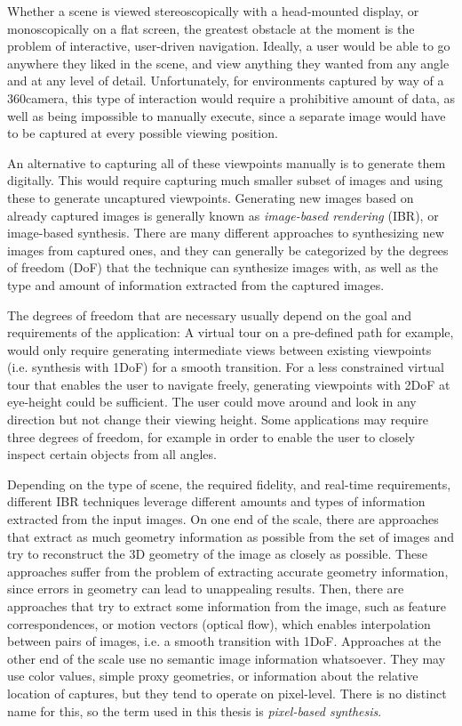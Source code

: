 Whether a scene is viewed stereoscopically with a head-mounted display, or monoscopically on a flat screen, the greatest obstacle at the moment is the problem of interactive, user-driven navigation. Ideally, a user would be able to go anywhere they liked in the scene, and view anything they wanted from any angle and at any level of detail. Unfortunately, for environments captured by way of a 360\degree camera, this type of interaction would require a prohibitive amount of data, as well as being impossible to manually execute, since a separate image would have to be captured at every possible viewing position.

An alternative to capturing all of these viewpoints manually is to generate them digitally. This would require capturing much smaller subset of images and using these to generate uncaptured viewpoints. Generating new images based on already captured images is generally known as \emph{image-based rendering} (IBR), or image-based synthesis. There are many different approaches to synthesizing new images from captured ones, and they can generally be categorized by the degrees of freedom (DoF) that the technique can synthesize images with, as well as the type and amount of information extracted from the captured images.

The degrees of freedom that are necessary usually depend on the goal and requirements of the application: A virtual tour on a pre-defined path for example, would only require generating intermediate views between existing viewpoints (i.e. synthesis with 1DoF) for a smooth transition. For a less constrained virtual tour that enables the user to navigate freely, generating viewpoints with 2DoF at eye-height could be sufficient. The user could move around and look in any direction but not change their viewing height. Some applications may require three degrees of freedom, for example in order to enable the user to closely inspect certain objects from all angles.

Depending on the type of scene, the required fidelity, and real-time requirements, different IBR techniques leverage different amounts and types of information extracted from the input images. On one end of the scale, there are approaches that extract as much geometry information as possible from the set of images and try to reconstruct the 3D geometry of the image as closely as possible. These approaches suffer from the problem of extracting accurate geometry information, since errors in geometry can lead to unappealing results.
Then, there are approaches that try to extract some information from the image, such as feature correspondences, or motion vectors (optical flow), which enables interpolation between pairs of images, i.e. a smooth transition with 1DoF.
Approaches at the other end of the scale use no semantic image information whatsoever. They may use color values, simple proxy geometries, or information about the relative location of captures, but they tend to operate on pixel-level. There is no distinct name for this, so the term used in this thesis is \emph{pixel-based synthesis}.

